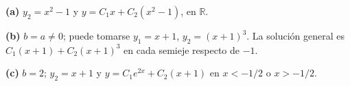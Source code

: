 \noindent\textbf{(a)} $y_2=x^2-1$ y $y=C_1x+C_2(x^2-1)$, en $\mathbb R$.

\noindent\textbf{(b)} $b=a\ne0$; puede tomarse $y_1=x+1$, $y_2=(x+1)^3$. La solución general es $C_1(x+1)+C_2(x+1)^3$ en cada semieje respecto de $-1$.

\noindent\textbf{(c)} $b=2$; $y_2=x+1$ y $y=C_1e^{2x}+C_2(x+1)$ en $x<-1/2$ o $x>-1/2$.
